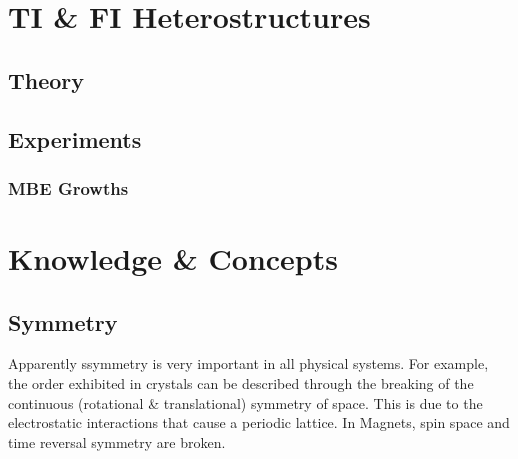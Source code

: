 \documentclass{article} %
\begin{document}
\section{TI \& FI Heterostructures}
\subsection{Theory}
\subsection{Experiments}
\subsubsection{MBE Growths}

\section{}


\section{Knowledge \& Concepts}
\subsection{Symmetry}
Apparently ssymmetry is very important in all physical systems. 
For example, the order exhibited in crystals can be described through the breaking of the continuous (rotational \& translational) symmetry of space. This is due to the electrostatic interactions that cause a periodic lattice. In Magnets, spin space and time reversal symmetry are broken.
%






\end{document}
